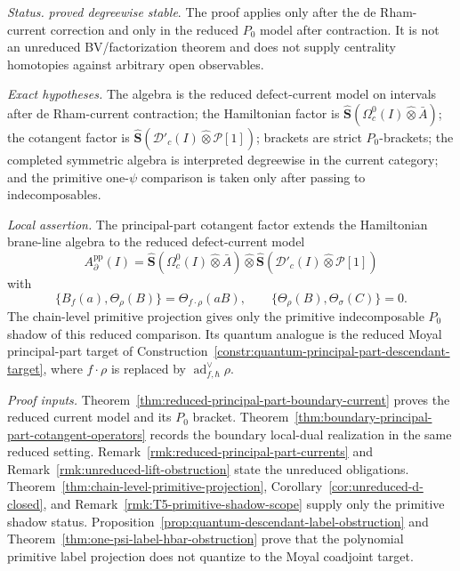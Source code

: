 \begin{stmt}\label{thm:lane-reduced-principal-part-current}
  \emph{Status.} \emph{proved degreewise stable}.  The proof applies
  only after the de Rham-current correction and only in the
  reduced \(P_0\) model after contraction.  It is not an unreduced
  BV/factorization theorem and does not supply centrality homotopies
  against arbitrary open observables.

  \emph{Exact hypotheses.} The algebra is the reduced
  defect-current model on intervals after de Rham-current contraction;
  the Hamiltonian factor is
  \(\widehat{\mathbf S}(\Omega_c^0(I)\widehat\otimes\bar A)\); the
  cotangent factor is
  \(\widehat{\mathbf S}(\mathcal D'_c(I)\widehat\otimes\mathcal P[1])\);
  brackets are strict \(P_0\)-brackets; the completed symmetric algebra
  is interpreted degreewise in the current category; and the primitive
  one-\(\psi\) comparison is taken only after passing to
  indecomposables.

  \emph{Local assertion.} The principal-part cotangent factor extends
  the Hamiltonian brane-line algebra to the reduced defect-current
  model
  \[
    A^{\mathrm{pp}}_\partial(I)
    =
    \widehat{\mathbf S}(\Omega_c^0(I)\widehat\otimes\bar A)
    \widehat\otimes
    \widehat{\mathbf S}(\mathcal D'_c(I)\widehat\otimes\mathcal P[1])
  \]
  with
  \[
    \{B_f(a),\Theta_\rho(B)\}
    =
    \Theta_{f\cdot\rho}(aB),
    \qquad
    \{\Theta_\rho(B),\Theta_\sigma(C)\}=0 .
  \]
  The chain-level primitive projection gives only the primitive
  indecomposable \(P_0\) shadow of this reduced comparison.
  Its quantum analogue is the reduced Moyal principal-part target of
  Construction~\ref{constr:quantum-principal-part-descendant-target},
  where \(f\cdot\rho\) is replaced by
  \(\operatorname{ad}^{\vee}_{f,\hbar}\rho\).

  \emph{Proof inputs.}
  Theorem~\ref{thm:reduced-principal-part-boundary-current} proves the
  reduced current model and its \(P_0\) bracket.  Theorem~\ref{thm:boundary-principal-part-cotangent-operators}
  records the boundary local-dual realization in the same reduced
  setting.  Remark~\ref{rmk:reduced-principal-part-currents} and
  Remark~\ref{rmk:unreduced-lift-obstruction} state the unreduced
  obligations.  Theorem~\ref{thm:chain-level-primitive-projection},
  Corollary~\ref{cor:unreduced-d-closed}, and
  Remark~\ref{rmk:T5-primitive-shadow-scope} supply only the primitive
  shadow status.  Proposition~\ref{prop:quantum-descendant-label-obstruction}
  and Theorem~\ref{thm:one-psi-label-hbar-obstruction} prove
  that the polynomial primitive label projection does not quantize to
  the Moyal coadjoint target.


\end{stmt}
